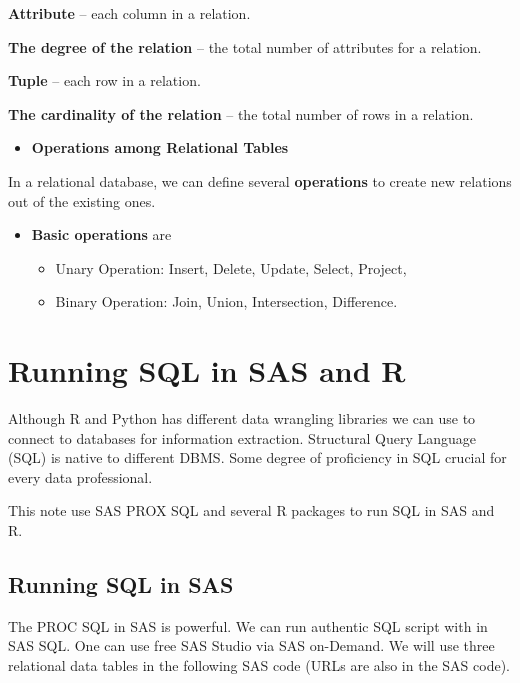 \documentclass[
]{book}
\providecommand{\tightlist}{%
  \setlength{\itemsep}{0pt}\setlength{\parskip}{0pt}}
\begin{document}
\textbf{Attribute} -- each column in a relation.

\textbf{The degree of the relation} -- the total number of attributes for a relation.

\textbf{Tuple} -- each row in a relation.

\textbf{The cardinality of the relation} -- the total number of rows in a relation.

\begin{itemize}
\tightlist
\item
  \textbf{Operations among Relational Tables}
\end{itemize}

In a relational database, we can define several \textbf{operations} to create new relations out of the existing ones.

\begin{itemize}
\item
  \textbf{Basic operations} are

  \begin{itemize}
  \tightlist
  \item
    Unary Operation: Insert, Delete, Update, Select, Project,
  \item
    Binary Operation: Join, Union, Intersection, Difference.
  \end{itemize}
\end{itemize}

\hypertarget{running-sql-in-sas-and-r}{%
\chapter{Running SQL in SAS and R}\label{running-sql-in-sas-and-r}}

Although R and Python has different data wrangling libraries we can use to connect to databases for information extraction. Structural Query Language (SQL) is native to different DBMS. Some degree of proficiency in SQL crucial for every data professional.

This note use SAS PROX SQL and several R packages to run SQL in SAS and R.

\hypertarget{running-sql-in-sas}{%
\section{Running SQL in SAS}\label{running-sql-in-sas}}

The PROC SQL in SAS is powerful. We can run authentic SQL script with in SAS SQL. One can use free SAS Studio via SAS on-Demand. We will use three relational data tables in the following SAS code (URLs are also in the SAS code).
\end{document}
